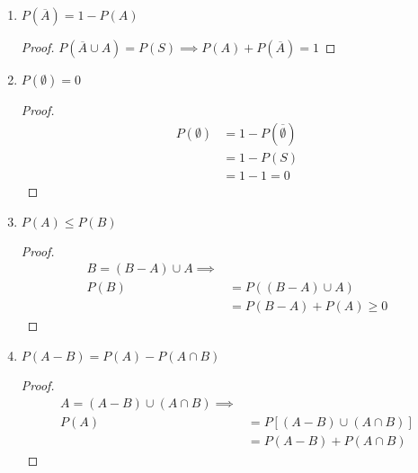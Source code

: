 \documentclass[11pt,a4paper,titlepage,draft]{article}
\begin{document}
\subsection{}
\begin{enumerate}
\item \(P(\overline{A}) = 1-P(A)\)

\begin{proof}
\(P(\overline{A} \cup A) = P(S) \implies P(A) + P(\overline{A})=1\)
\end{proof}

\item \(P(\emptyset) = 0\)
\begin{proof}
\begin{align*}
P(\emptyset)&=1-P(\overline{\emptyset}) \\ &= 1-P(S) \\ &= 1-1 =0
\end{align*}
\end{proof}

\item \(P(A) \leq P(B)\)

\begin{proof}
\begin{align*}
B = (B-A) \cup A \implies \\
P(B) &= P \left( (B-A) \cup A \right) \\
&= P(B-A) + P(A) \geq 0
\end{align*}
\end{proof}

\item \(P(A-B) = P(A) - P(A\cap B)\)


\begin{proof}
\begin{align*}
A = (A-B) \cup (A \cap B) \implies \\
P(A) &= P \left[ (A-B) \cup (A \cap B) \right] \\
&= P(A-B) + P(A \cap B)
\end{align*}
\end{proof}


\end{enumerate}
\end{document}
